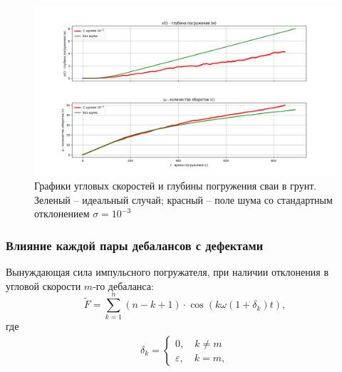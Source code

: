 \documentclass{beamer}
\begin{document}
    \begin{frame}
        \begin{figure}[ht]
            \centering
            \includegraphics[width=1\linewidth]{dive_with_noise}
            \caption{Графики угловых скоростей и глубины погружения сваи в грунт.
            Зеленый -- идеальный случай; красный -- поле шума со стандартным отклонением $\sigma = 10^{-3}$}
            \label{fig:dive_with_noise}
        \end{figure}
    \end{frame}

    \begin{frame}
        \frametitle{Влияние каждой пары дебалансов с дефектами}
        Вынуждающая сила импульсного погружателя, при наличии отклонения в угловой скорости $m$-го дебаланса:
        \begin{equation}
            \label{eq:F_noise_one_deb}
            \widetilde{F} = \sum\limits_{k = 1}^n (n - k + 1) \cdot \cos (k \omega (1 + \delta_k) t),
        \end{equation}
        где
        \begin{equation}
            \begin{aligned}
                \delta_k =
                \begin{cases}
                    0, \quad k \neq m \\
                    \varepsilon, \quad k = m,
                \end{cases}
            \end{aligned}
        \end{equation}
    \end{frame}
\end{document}
